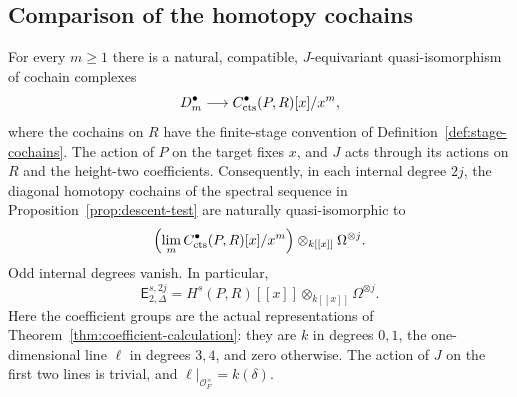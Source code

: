 \subsection{Comparison of the homotopy cochains}

\begin{theorem}
\label{thm:jet-comparison}
For every $m\geq1$ there is a natural, compatible, $J$-equivariant
quasi-isomorphism of cochain complexes
\begin{equation}\label{eq:finite-jet-map}
  D_m^\bullet\longrightarrow C^\bullet_{\mathrm{cts}}(P,R)[x]/x^m,
\end{equation}
where the cochains on $R$ have the finite-stage convention of
Definition~\ref{def:stage-cochains}.  The action of $P$ on the target
fixes $x$, and $J$ acts through its actions on $R$ and the height-two
coefficients.  Consequently, in each internal degree $2j$, the
diagonal homotopy cochains of the spectral sequence in
Proposition~\ref{prop:descent-test} are naturally quasi-isomorphic to
\begin{equation}\label{eq:all-jet-comparison}
  \left(\lim_mC^\bullet_{\mathrm{cts}}(P,R)[x]/x^m\right)
            \otimes_{k[[x]]}\Omega^{\otimes j}.
\end{equation}
Odd internal degrees vanish.  In particular,
\begin{equation}\label{eq:homotopy-second-page}
  \mathsf E_{2,\Delta}^{s,2j}
      =H^s(P,R)[[x]]\otimes_{k[[x]]}\Omega^{\otimes j}.
\end{equation}
Here the coefficient groups are the actual representations of
Theorem~\ref{thm:coefficient-calculation}: they are $k$ in degrees
$0,1$, the one-dimensional line $\ell$ in degrees $3,4$, and zero
otherwise.  The action of $J$ on the first two lines is trivial, and
$\ell|_{\mathcal O_F^\times}=k(\delta)$.
\end{theorem}

